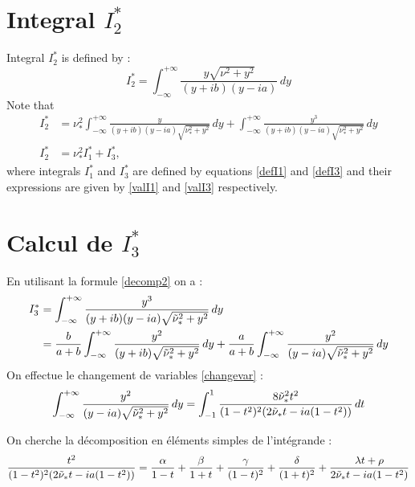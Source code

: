 \section{Integral $I_2^*$}
\label{calcI2}
Integral $I_2^*$ is defined by :
\begin{equation}
I_2^*=  \int_{-\infty}^{+\infty} \frac{y\sqrt{\nu^2+y^2}}{(y+ib)(y-ia)}\, dy
\label{defI2}
\end{equation}
Note that
\begin{equation*}
\begin{split}
I_2^*&=\nu_*^2 \int_{-\infty}^{+\infty}  \frac{y}{(y+ib)(y-ia)\sqrt{\nu_*^2+y^2}}\,dy+ \int_{-\infty}^{+\infty} \frac{y^3}{(y+ib)(y-ia)\sqrt{\nu_*^2+y^2}} \, dy\\
I_2^*&=\nu_*^2 I_1^*+I_3^*,
\end{split}
\end{equation*}
where integrals $I_1^*$ and $I_3^*$ are defined by equations \eqref{defI1} and \eqref{defI3} and their expressions are given by \eqref{valI1} and \eqref{valI3} respectively.

\section{Calcul de $I_3^*$}
\label{calcI3}
En utilisant la formule \eqref{decomp2} on a :
\begin{equation*}
\begin{split}
I_3^*&=\int_{-\infty}^{+\infty} \frac{y^3}{(y+ib)(y-ia)\sqrt{\tilde{\nu}_*^2+y^2}} \,dy \\
&=\frac{b}{a+b}\int_{-\infty}^{+\infty} \frac{y^2}{(y+ib)\sqrt{\tilde{\nu}_*^2+y^2}} \, dy +\frac{a}{a+b}\int_{-\infty}^{+\infty} \frac{y^2}{(y-ia)\sqrt{\tilde{\nu}_*^2+y^2}} \, dy
\end{split}
\end{equation*}
On effectue le changement de variables \eqref{changevar} :
\begin{equation}
 \int_{-\infty}^{+\infty} \frac{y^2}{(y-ia)\sqrt{\tilde{\nu}_*^2+y^2}} \,dy = \int_{-1}^1 \frac{8\tilde{\nu}_*^2t^2}{(1-t^2)^2(2\tilde{\nu}_* t -ia(1-t^2))} \, dt
\end{equation}

On cherche la décomposition en éléments simples de l'intégrande :
\begin{equation*}
\frac{t^2}{(1-t^2)^2(2\tilde{\nu}_* t -ia(1-t^2))}=\frac{\alpha}{1-t}+\frac{\beta}{1+t}+ \frac{\gamma}{(1-t)^2}+\frac{\delta}{(1+t)^2} +\frac{\lambda t + \rho }{2\tilde{\nu}_* t-ia(1-t^2)}
\end{equation*}

